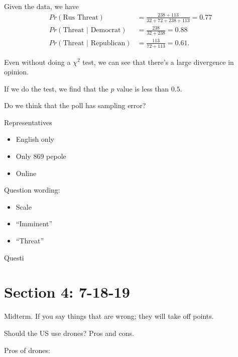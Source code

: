 \documentclass{article}
\begin{document}
Given the data, we have
\begin{align*}
  Pr(\text{Rus Threat}) &= \frac{238 + 113}{32 + 72 + 238 + 113} = 0.77 \\
  Pr(\text{Threat | Democrat}) &= \frac{238}{32 + 238} = 0.88 \\
  Pr(\text{Threat | Republican}) &= \frac{113}{72 + 113} = 0.61.
\end{align*}

Even without doing a $\chi^2$ test, we can see that there's a large divergence in opinion.

If we do the test, we find that the $p$ value is less than $0.5$.

Do we think that the poll has sampling error?

Representatives
\begin{itemize}
  \item English only
  \item  Only 869 pepole
  \item Online
\end{itemize}

Question wording:

\begin{itemize}
  \item Scale
  \item ``Imminent''
  \item ``Threat''
\end{itemize}
Questi


\section{Section 4: 7-18-19}

Midterm. If you say things that are wrong; they will take off points.

Should the US use drones?  Pros and cons.

Pros of drones:
\end{document}
